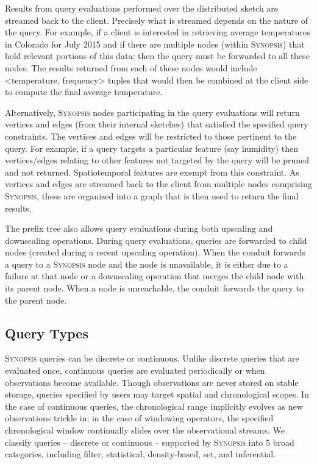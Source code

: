 Results from query evaluations performed over the distributed sketch are streamed back to the client.  Precisely what is streamed depends on the nature of the query.  For example, if a client is interested in retrieving average temperatures in Colorado for July 2015 and if there are multiple nodes (within \textsc{Synopsis}) that hold relevant portions of this data; then the query must be forwarded to all these nodes. The results returned from each of these nodes would include {\textless}temperature, frequency{\textgreater} tuples that would then be combined at the client side to compute the final average temperature.

Alternatively, \textsc{Synopsis} nodes participating in the query evaluations will return vertices and edges (from their internal sketches) that satisfied the specified query constraints. The vertices and edges will be restricted to those pertinent to the query. For example, if a query targets a particular feature (say humidity) then vertices/edges relating to other features not targeted by the query will be pruned and not returned.  Spatiotemporal features are exempt from this constraint. As vertices and edges are streamed back to the client from multiple nodes comprising \textsc{Synopsis}, these are organized into a graph that is then used to return the final results. 

The prefix tree also allows query evaluations during both upscaling and downscaling operations. During query evaluations, queries are forwarded to child nodes (created during a recent upscaling operation). When the conduit forwards a query to a \textsc{Synopsis} node and the node is unavailable, it is either due to a failure at that node or a downscaling operation that merges the child node with its parent node. When a node is unreachable, the conduit forwards the query to the parent node. 

\subsection{Query Types}
\textsc{Synopsis} queries can be discrete or continuous. Unlike discrete queries that are evaluated once, continuous queries are evaluated periodically or when observations become available. Though observations are never stored on stable storage, queries specified by users may target spatial and chronological scopes. In the case of continuous queries, the chronological range implicitly evolves as new observations trickle in; in the case of windowing operators, the specified chronological window continually slides over the observational streams. We classify queries -- discrete or continuous -- supported by \textsc{Synopsis} into 5 broad categories, including filter, statistical, density-based, set, and inferential.

